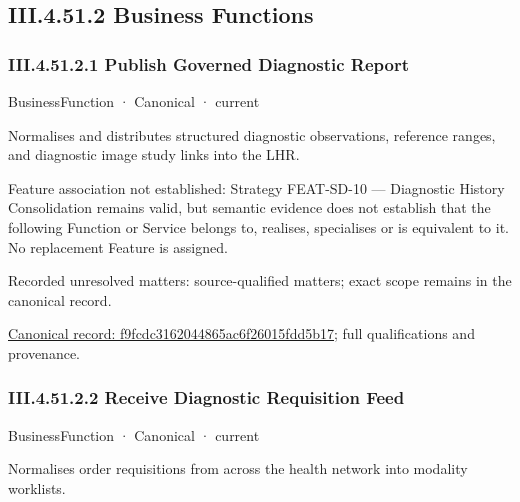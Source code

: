 \subsection*{III.4.51.2 Business Functions}
\label{navigation:III.4.51.2}

\subsubsection*{III.4.51.2.1 Publish Governed Diagnostic Report}
\label{navigation:III.4.51.2.1}

\label{element:f9fcdc3162044865ac6f26015fdd5b17}
{\small BusinessFunction · Canonical · current}\par

Normalises and distributes structured diagnostic observations, reference ranges, and diagnostic image study links into the LHR.



Feature association not established: Strategy FEAT-SD-10 — Diagnostic History Consolidation remains valid, but semantic evidence does not establish that the following Function or Service belongs to, realises, specialises or is equivalent to it. No replacement Feature is assigned.


{\small Recorded unresolved matters: source-qualified matters; exact scope remains in the canonical record.}\par
{\footnotesize \href{../../../../continuum/business/business-function/f9fcdc3162044865ac6f26015fdd5b17.md}{Canonical record: f9fcdc3162044865ac6f26015fdd5b17}; full qualifications and provenance.}\par
\subsubsection*{III.4.51.2.2 Receive Diagnostic Requisition Feed}
\label{navigation:III.4.51.2.2}

\label{element:af3d47ada486425abc5ab5d054db7004}
{\small BusinessFunction · Canonical · current}\par

Normalises order requisitions from across the health network into modality worklists.



